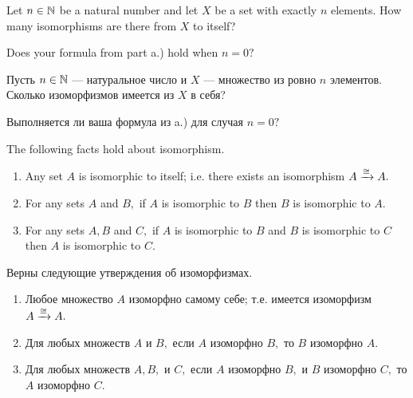 \documentclass[CT4S-EN-RU]{subfiles}
\begin{document}
\begin{exerciseENG}
Let $n\in{\mathbb N}$ be a natural number and let $X$ be a set with exactly $n$ elements. 
\sexc How many isomorphisms are there from $X$ to itself? 
\item Does your formula from part a.) hold when $n=0?$
\endsexc
\end{exerciseENG}

\begin{exerciseRUS}
Пусть $n\in{\mathbb N}$ — натуральное число и $X$ — множество из ровно $n$ элементов. 
\sexc Сколько изоморфизмов имеется из $X$ в себя? 
\item Выполняется ли ваша формула из a.) для случая $n=0?$
\endsexc 
\end{exerciseRUS}

\begin{lemmaENG}\label{lemma:isomorphic ER in Set}
The following facts hold about isomorphism.
\begin{enumerate}
\item Any set $A$ is isomorphic to itself; i.e. there exists an isomorphism $A\xrightarrow{\cong} A.$
\item For any sets $A$ and $B,$ if $A$ is isomorphic to $B$ then $B$ is isomorphic to $A.$
\item For any sets $A, B$ and $C,$ if $A$ is isomorphic to $B$ and $B$ is isomorphic to $C$ then $A$ is isomorphic to $C.$
\end{enumerate}
\end{lemmaENG}

\begin{lemmaRUS}\label{lemma:isomorphic ER in Set}
Верны следующие утверждения об изоморфизмах.
\begin{enumerate}
\item Любое множество $A$ изоморфно самому себе; т.е. имеется изоморфизм $A\xrightarrow{\cong} A.$
\item Для любых множеств $A$ и $B,$ если $A$ изоморфно $B,$ то $B$ изоморфно $A.$
\item Для любых множеств $A, B,$ и $C,$ если $A$ изоморфно $B,$ и $B$ изоморфно $C,$ то $A$ изоморфно $C.$
\end{enumerate}
\end{lemmaRUS}
\end{document}
